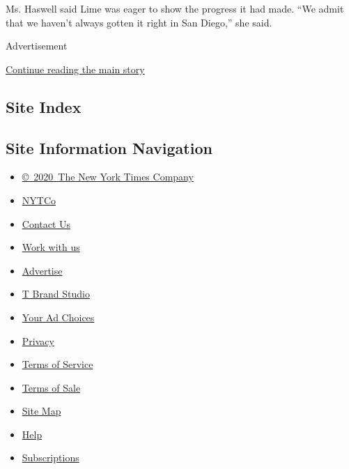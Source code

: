 Ms. Haswell said Lime was eager to show the progress it had made. ``We
admit that we haven't always gotten it right in San Diego,'' she said.

Advertisement

\protect\hyperlink{after-bottom}{Continue reading the main story}

\hypertarget{site-index}{%
\subsection{Site Index}\label{site-index}}

\hypertarget{site-information-navigation}{%
\subsection{Site Information
Navigation}\label{site-information-navigation}}

\begin{itemize}
\tightlist
\item
  \href{https://help.nytimes3xbfgragh.onion/hc/en-us/articles/115014792127-Copyright-notice}{©~2020~The
  New York Times Company}
\end{itemize}

\begin{itemize}
\tightlist
\item
  \href{https://www.nytco.com/}{NYTCo}
\item
  \href{https://help.nytimes3xbfgragh.onion/hc/en-us/articles/115015385887-Contact-Us}{Contact
  Us}
\item
  \href{https://www.nytco.com/careers/}{Work with us}
\item
  \href{https://nytmediakit.com/}{Advertise}
\item
  \href{http://www.tbrandstudio.com/}{T Brand Studio}
\item
  \href{https://www.nytimes3xbfgragh.onion/privacy/cookie-policy\#how-do-i-manage-trackers}{Your
  Ad Choices}
\item
  \href{https://www.nytimes3xbfgragh.onion/privacy}{Privacy}
\item
  \href{https://help.nytimes3xbfgragh.onion/hc/en-us/articles/115014893428-Terms-of-service}{Terms
  of Service}
\item
  \href{https://help.nytimes3xbfgragh.onion/hc/en-us/articles/115014893968-Terms-of-sale}{Terms
  of Sale}
\item
  \href{https://spiderbites.nytimes3xbfgragh.onion}{Site Map}
\item
  \href{https://help.nytimes3xbfgragh.onion/hc/en-us}{Help}
\item
  \href{https://www.nytimes3xbfgragh.onion/subscription?campaignId=37WXW}{Subscriptions}
\end{itemize}
